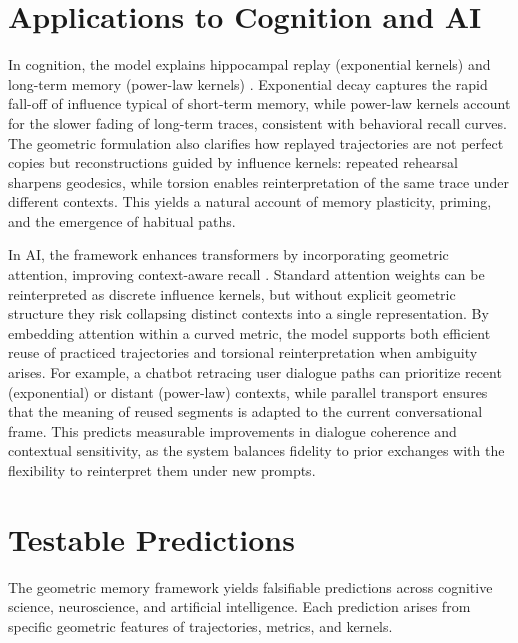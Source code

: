 \documentclass[a4paper,12pt]{article}
\begin{document}
\section{Applications to Cognition and AI}
In cognition, the model explains hippocampal replay (exponential kernels) and long-term 
memory (power-law kernels) \citep{mcclelland1995why}. Exponential decay captures the 
rapid fall-off of influence typical of short-term memory, while power-law kernels account 
for the slower fading of long-term traces, consistent with behavioral recall curves. The 
geometric formulation also clarifies how replayed trajectories are not perfect copies but 
reconstructions guided by influence kernels: repeated rehearsal sharpens geodesics, while 
torsion enables reinterpretation of the same trace under different contexts. This yields a 
natural account of memory plasticity, priming, and the emergence of habitual paths.

In AI, the framework enhances transformers by incorporating geometric attention, improving 
context-aware recall \citep{vaswani2017attention}. Standard attention weights can be 
reinterpreted as discrete influence kernels, but without explicit geometric structure they 
risk collapsing distinct contexts into a single representation. By embedding attention 
within a curved metric, the model supports both efficient reuse of practiced trajectories 
and torsional reinterpretation when ambiguity arises. For example, a chatbot retracing 
user dialogue paths can prioritize recent (exponential) or distant (power-law) contexts, 
while parallel transport ensures that the meaning of reused segments is adapted to the 
current conversational frame. This predicts measurable improvements in dialogue coherence 
and contextual sensitivity, as the system balances fidelity to prior exchanges with the 
flexibility to reinterpret them under new prompts.

\section{Testable Predictions}
The geometric memory framework yields falsifiable predictions across
cognitive science, neuroscience, and artificial intelligence. Each prediction
arises from specific geometric features of trajectories, metrics, and kernels.
\end{document}
